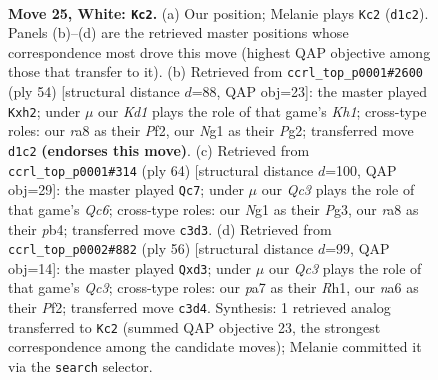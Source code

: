 \documentclass[11pt]{article}
\begin{document}
\clearpage

\begin{figure}[p]\centering
\begin{subfigure}{0.46\textwidth}\centering
\resizebox{\linewidth}{!}{%
\newchessgame
\chessboard[
  setfen={r1b2k2/pp3pp1/n3pq2/3p4/3r4/PPQ5/6PP/R2K2NR w - - 0 25},
  showmover=false,
  pgfstyle=straightmove, color=movearrow, markmove={d1-c2}
]}
\caption{}
\end{subfigure}\hfill
\begin{subfigure}{0.46\textwidth}\centering
\resizebox{\linewidth}{!}{%
\newchessgame
\chessboard[
  setfen={6k1/1pq2p1p/p2r2pB/2n1p3/1QP5/1P6/P3NPPb/4R2K w - - 5 28},
  showmover=false,
  pgfstyle=straightmove, color=movearrow, markmove={h1-h2}
]}
\caption{}
\end{subfigure}
\\[4pt]
\begin{subfigure}{0.46\textwidth}\centering
\resizebox{\linewidth}{!}{%
\newchessgame
\chessboard[
  setfen={r4bk1/1R3N1p/2Q1p1p1/P2r4/1p2q3/3p2PP/5P2/R5K1 w - - 0 33},
  showmover=false,
  pgfstyle=straightmove, color=movearrow, markmove={c6-c7}
]}
\caption{}
\end{subfigure}\hfill
\begin{subfigure}{0.46\textwidth}\centering
\resizebox{\linewidth}{!}{%
\newchessgame
\chessboard[
  setfen={r7/1p4k1/np3rpp/3P1q2/N6P/1PQp1p2/P4P2/1K1R3R w - - 2 29},
  showmover=false,
  pgfstyle=straightmove, color=movearrow, markmove={c3-d3}
]}
\caption{}
\end{subfigure}
\caption{\textbf{Move 25, White: \texttt{Kc2}.} (a) Our position; Melanie plays \texttt{Kc2} (\texttt{d1c2}). Panels (b)--(d) are the retrieved master positions whose correspondence most drove this move (highest QAP objective among those that transfer to it). (b) Retrieved from \texttt{ccrl\_top\_p0001\#2600} (ply 54) [structural distance $d$=88, QAP obj=23]: the master played \texttt{Kxh2}; under $\mu$ our \emph{Kd1} plays the role of that game's \emph{Kh1}; cross-type roles: our \emph{r}a8 as their \emph{P}f2, our \emph{N}g1 as their \emph{P}g2; transferred move \texttt{d1c2} \textbf{(endorses this move)}. (c) Retrieved from \texttt{ccrl\_top\_p0001\#314} (ply 64) [structural distance $d$=100, QAP obj=29]: the master played \texttt{Qc7}; under $\mu$ our \emph{Qc3} plays the role of that game's \emph{Qc6}; cross-type roles: our \emph{N}g1 as their \emph{P}g3, our \emph{r}a8 as their \emph{p}b4; transferred move \texttt{c3d3}. (d) Retrieved from \texttt{ccrl\_top\_p0002\#882} (ply 56) [structural distance $d$=99, QAP obj=14]: the master played \texttt{Qxd3}; under $\mu$ our \emph{Qc3} plays the role of that game's \emph{Qc3}; cross-type roles: our \emph{p}a7 as their \emph{R}h1, our \emph{n}a6 as their \emph{P}f2; transferred move \texttt{c3d4}. Synthesis: 1 retrieved analog transferred to \texttt{Kc2} (summed QAP objective 23, the strongest correspondence among the candidate moves); Melanie committed it via the \texttt{search} selector.}
\label{fig:thought-m48}
\end{figure}
\end{document}
